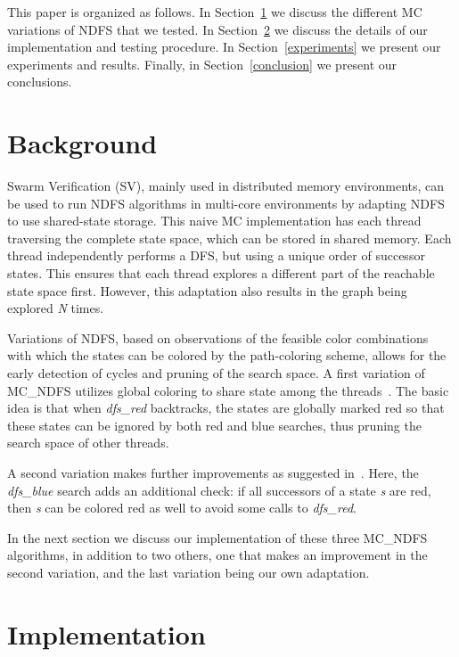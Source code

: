 \documentclass[a4paper]{article}
\begin{document}
This paper is organized as follows. In Section~\ref{background} we discuss the different MC variations of NDFS that we tested. In Section~\ref{implementation} we discuss the details of our implementation and testing procedure. In Section~\ref{experiments} we present our experiments and results. Finally, in Section~\ref{conclusion} we present our conclusions.


\section{Background}\label{background}

Swarm Verification (SV), mainly used in distributed memory environments, can be used to run NDFS algorithms in multi-core environments by adapting NDFS to use shared-state storage. This naive MC implementation has each thread traversing the complete state space, which can be stored in shared memory. Each thread independently performs a DFS, but using a unique order of successor states. This ensures that each thread explores a different part of the reachable state space first. However, this adaptation also results in the graph being explored \emph{N} times.

Variations of NDFS, based on observations of the feasible color combinations with which the states can be colored by the path-coloring scheme, allows for the early detection of cycles and pruning of the search space. A first variation of MC\_NDFS utilizes global coloring to share state among the threads~\cite{nndfs}. The basic idea is that when \emph{dfs\_red} backtracks, the states are globally marked red so that these states can be ignored by both red and blue searches, thus pruning the search space of other threads.

A second variation makes further improvements as suggested in~\cite{allred}. Here, the \emph{dfs\_blue} search adds an additional check: if all successors of a state \emph{s} are red, then \emph{s} can be colored red as well to avoid some calls to \emph{dfs\_red}.

In the next section we discuss our implementation of these three MC\_NDFS algorithms, in addition to two others, one that makes an improvement in the second variation, and the last variation being our own adaptation.


\section{Implementation}\label{implementation}
\end{document}
